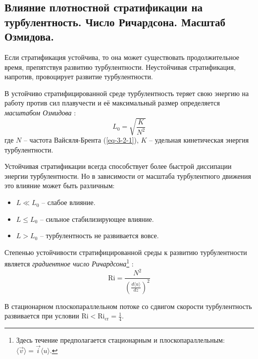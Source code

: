 \subsection{Влияние плотностной стратификации на турбулентность. Число Ричардсона. Масштаб Озмидова.}
Если стратификация устойчива, то она может существовать продолжительное время, препятствуя развитию турбулентности.
Неустойчивая стратификация, напротив, провоцирует развитие турбулентности.

В устойчиво стратифицированной среде турбулентность теряет свою энергию на работу против сил плавучести и её максимальный размер определяется \textit{масштабом Озмидова} \cite{Носов-2013}:
\begin{equation}
L_0=\sqrt{\frac{K}{N^2}}
\end{equation}
где $N$ -- частота Вайсяля-Брента (\ref{eq-3-2-1}), $K$ -- удельная кинетическая энергия турбулентности.

Устойчивая стратификации всегда способствует более быстрой диссипации энергии турбулентности.
Но в зависимости от масштаба турбулентного движения это влияние может быть различным:
\begin{itemize}
\item $L\ll L_0$ -- слабое влияние.
\item $L\le L_0$ -- сильное стабилизирующее влияние.
\item $L>L_0$ -- турбулентность не развивается вовсе.
\end{itemize}

Степенью устойчивости стратифицированной среды к развитию турбулентности является \textit{градиентное число Ричардсона}\footnote{Здесь течение предполагается стационарным и плоскопараллельным: $\langle\vec{v}\rangle=\vec{i}\langle u\rangle$.} \cite{Носов-2013}:
\begin{equation}
\text{Ri}=\frac{N^2}{\left(\frac{d\langle u\rangle}{dz}\right)^2}
\end{equation}

В стационарном плоскопараллельном потоке со сдвигом скорости турбулентность развивается при условии $\text{Ri}<\text{Ri}_\text{cr}=\frac{1}{4}$.
